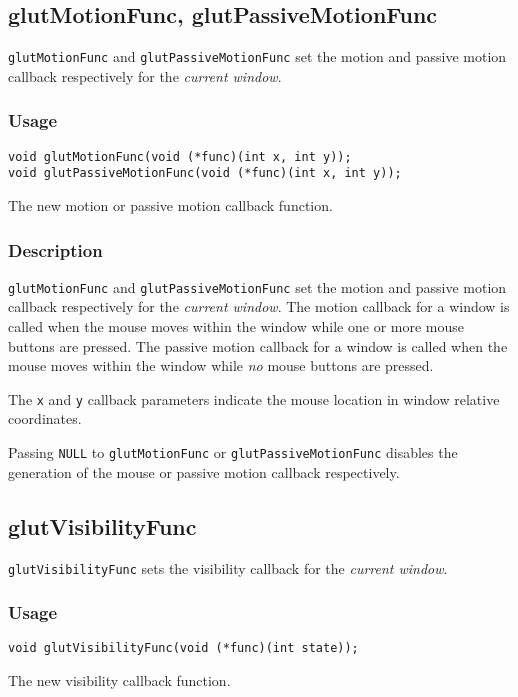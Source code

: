 \subsection{glutMotionFunc, glutPassiveMotionFunc}

{\tt glutMotionFunc} and {\tt glutPassiveMotionFunc} set the motion and
passive motion callback respectively for the {\em current window}.

\subsubsection*{Usage}
\begin{verbatim}
void glutMotionFunc(void (*func)(int x, int y));
void glutPassiveMotionFunc(void (*func)(int x, int y));
\end{verbatim}
\begin{description}
\itemsep 0in
\item[\tt func]
The new motion or passive motion callback function.
\end{description}

\subsubsection*{Description}

{\tt glutMotionFunc} and {\tt glutPassiveMotionFunc} set the motion and
passive motion callback respectively for the {\em current window}.
The motion callback for a window is called when the mouse moves
within the window while one or more mouse buttons are pressed.  The
passive motion callback for a window is called when the mouse moves
within the window while {\em no} mouse buttons are pressed.

The {\tt x} and {\tt y} callback parameters indicate the mouse location
in window relative coordinates.

Passing {\tt NULL} to {\tt glutMotionFunc} or {\tt glutPassiveMotionFunc}
disables the generation of the mouse or passive motion callback
respectively.

\subsection{glutVisibilityFunc}

{\tt glutVisibilityFunc} sets the visibility callback for the {\em
current window}.

\subsubsection*{Usage}
\begin{verbatim}
void glutVisibilityFunc(void (*func)(int state));
\end{verbatim}
\begin{description}
\itemsep 0in
\item[\tt func]
The new visibility callback function.
\end{description}

